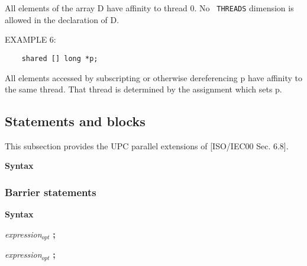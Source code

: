    All elements of the array D have affinity to thread 0.  No {\tt
   THREADS} dimension is allowed in the declaration of D.

\np EXAMPLE 6: 

\begin{verbatim}
    shared [] long *p;
\end{verbatim}
    

   All elements accessed by subscripting or otherwise dereferencing
   p have affinity to the same thread.  That thread is determined by
   the assignment which sets p.

\subsection{Statements and blocks}

\npf This subsection provides the UPC parallel extensions of
    [ISO/IEC00 Sec. 6.8].

{\bf Syntax} 


\hspace{3em}{\em labeled-statement}

\hspace{3em}{\em compound-statement}

\hspace{3em}{\em expression-statement}

\hspace{3em}{\em selection-statement}

\hspace{3em}{\em iteration-statement}

\hspace{3em}{\em jump-statement}

\hspace{3em}{\em synchronization-statement}

\subsubsection{Barrier statements}
\label{upc_barrier}

{\bf Syntax} 


\hspace{3em}{\bf upc\_notify} {\em expression$_{opt}$} {\bf ;}

\hspace{3em}{\bf upc\_wait} {\em expression$_{opt}$} {\bf ;}

